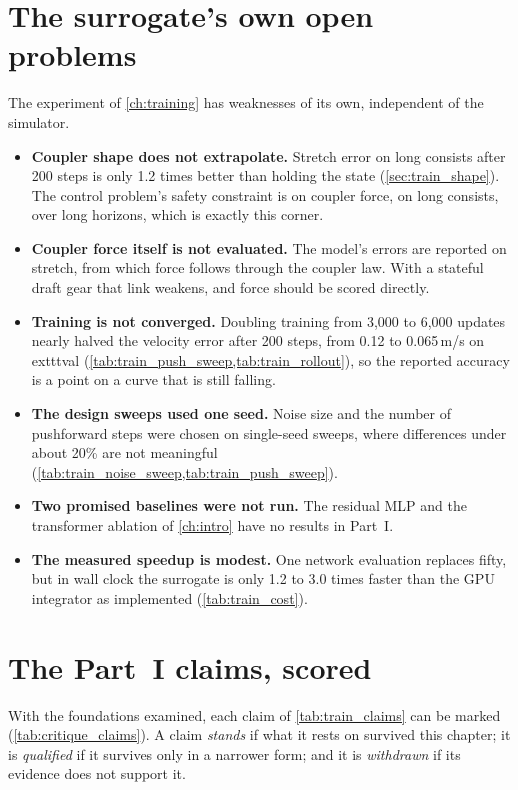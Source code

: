 \section{The surrogate's own open problems}
\label{sec:critique_surrogate}

The experiment of \cref{ch:training} has weaknesses of its own, independent of the simulator.

\begin{itemize}
    \item \textbf{Coupler shape does not extrapolate.} Stretch error on long consists after 200 steps is only 1.2 times better than holding the state (\cref{sec:train_shape}). The control problem's safety constraint is on coupler force, on long consists, over long horizons, which is exactly this corner.
    \item \textbf{Coupler force itself is not evaluated.} The model's errors are reported on stretch, from which force follows through the coupler law. With a stateful draft gear that link weakens, and force should be scored directly.
    \item \textbf{Training is not converged.} Doubling training from 3,000 to 6,000 updates nearly halved the velocity error after 200 steps, from 0.12 to 0.065\,m/s on 	exttt{val} (\cref{tab:train_push_sweep,tab:train_rollout}), so the reported accuracy is a point on a curve that is still falling.
    \item \textbf{The design sweeps used one seed.} Noise size and the number of pushforward steps were chosen on single-seed sweeps, where differences under about 20\% are not meaningful (\cref{tab:train_noise_sweep,tab:train_push_sweep}).
    \item \textbf{Two promised baselines were not run.} The residual MLP and the transformer ablation of \cref{ch:intro} have no results in Part~I.
    \item \textbf{The measured speedup is modest.} One network evaluation replaces fifty, but in wall clock the surrogate is only 1.2 to 3.0 times faster than the GPU integrator as implemented (\cref{tab:train_cost}).
\end{itemize}

\section{The Part~I claims, scored}
\label{sec:critique_claims}

With the foundations examined, each claim of \cref{tab:train_claims} can be marked (\cref{tab:critique_claims}). A claim \emph{stands} if what it rests on survived this chapter; it is \emph{qualified} if it survives only in a narrower form; and it is \emph{withdrawn} if its evidence does not support it.

